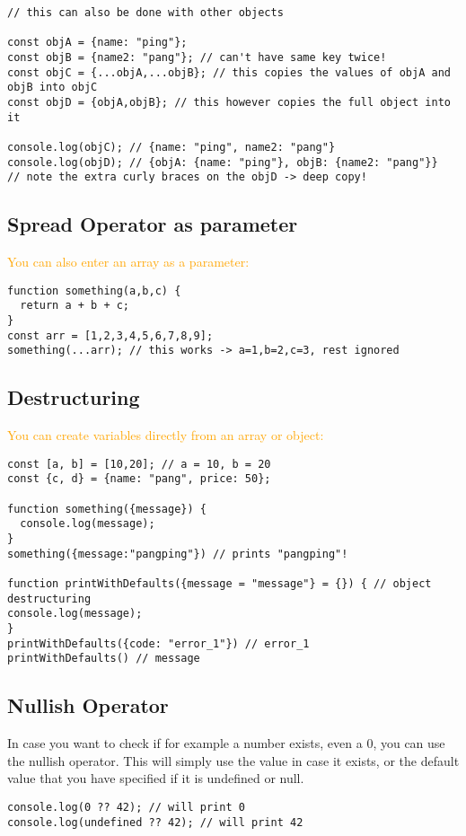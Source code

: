 \documentclass[main.tex,fontsize=6pt,paper=a4,paper=landscape,DIV=calc,]{scrartcl}
\begin{document}
\begin{multicols*}{4}
\begin{lstlisting}
// this can also be done with other objects

const objA = {name: "ping"};
const objB = {name2: "pang"}; // can't have same key twice!
const objC = {...objA,...objB}; // this copies the values of objA and objB into objC
const objD = {objA,objB}; // this however copies the full object into it

console.log(objC); // {name: "ping", name2: "pang"}
console.log(objD); // {objA: {name: "ping"}, objB: {name2: "pang"}}
// note the extra curly braces on the objD -> deep copy!
\end{lstlisting}
\vspace{2mm}

\subsection{Spread Operator as parameter}  
\textcolor{orange}{You can also enter an array as a parameter:}
\vspace{-2mm}
\begin{lstlisting}
function something(a,b,c) {
  return a + b + c;
}
const arr = [1,2,3,4,5,6,7,8,9];
something(...arr); // this works -> a=1,b=2,c=3, rest ignored
\end{lstlisting}
\vspace{2mm}

\subsection{Destructuring}  
\textcolor{orange}{You can create variables directly from an array or object:}
\vspace{-2mm}
\begin{lstlisting}
const [a, b] = [10,20]; // a = 10, b = 20 
const {c, d} = {name: "pang", price: 50};

function something({message}) {
  console.log(message);
}
something({message:"pangping"}) // prints "pangping"!

function printWithDefaults({message = "message"} = {}) { // object destructuring
console.log(message);
}
printWithDefaults({code: "error_1"}) // error_1
printWithDefaults() // message
\end{lstlisting}
\vspace{2mm}

\subsection{Nullish Operator}  
In case you want to check if for example a number exists, even a 0, you can use the nullish operator.\newline
This will simply use the value in case it exists, or the default value that you have specified if it is undefined or null.
\vspace{-2mm}
\begin{lstlisting}
console.log(0 ?? 42); // will print 0 
console.log(undefined ?? 42); // will print 42
\end{lstlisting}
\vspace{2mm}



\end{multicols*}
\end{document}
